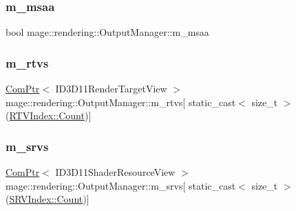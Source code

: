 \hypertarget{classmage_1_1rendering_1_1_output_manager_a3affee412b093ea168b9e4a22c713421}{}\label{classmage_1_1rendering_1_1_output_manager_a3affee412b093ea168b9e4a22c713421} 
\subsubsection{\texorpdfstring{m\+\_\+msaa}{m\_msaa}}
{\footnotesize\ttfamily bool mage\+::rendering\+::\+Output\+Manager\+::m\+\_\+msaa\hspace{0.3cm}{\ttfamily [private]}}

\hypertarget{classmage_1_1rendering_1_1_output_manager_afd0aade15fe5b0f9f4f0bef9f7ea3715}{}\label{classmage_1_1rendering_1_1_output_manager_afd0aade15fe5b0f9f4f0bef9f7ea3715} 
\subsubsection{\texorpdfstring{m\+\_\+rtvs}{m\_rtvs}}
{\footnotesize\ttfamily \hyperlink{namespacemage_ae74f374780900893caa5555d1031fd79}{Com\+Ptr}$<$ I\+D3\+D11\+Render\+Target\+View $>$ mage\+::rendering\+::\+Output\+Manager\+::m\+\_\+rtvs\mbox{[} static\+\_\+cast$<$ size\+\_\+t $>$(\hyperlink{classmage_1_1rendering_1_1_output_manager_af9caebb7e9cacf454d26b827a01e857cae93f994f01c537c4e2f7d8528c3eb5e9}{R\+T\+V\+Index\+::\+Count})\mbox{]}\hspace{0.3cm}{\ttfamily [private]}}

\hypertarget{classmage_1_1rendering_1_1_output_manager_ac002667bd25dd978d6ff0ece782c8455}{}\label{classmage_1_1rendering_1_1_output_manager_ac002667bd25dd978d6ff0ece782c8455} 
\subsubsection{\texorpdfstring{m\+\_\+srvs}{m\_srvs}}
{\footnotesize\ttfamily \hyperlink{namespacemage_ae74f374780900893caa5555d1031fd79}{Com\+Ptr}$<$ I\+D3\+D11\+Shader\+Resource\+View $>$ mage\+::rendering\+::\+Output\+Manager\+::m\+\_\+srvs\mbox{[} static\+\_\+cast$<$ size\+\_\+t $>$(\hyperlink{classmage_1_1rendering_1_1_output_manager_a941f1b35a83ee0ce190494523ec0fe63ae93f994f01c537c4e2f7d8528c3eb5e9}{S\+R\+V\+Index\+::\+Count})\mbox{]}\hspace{0.3cm}{\ttfamily [private]}}

